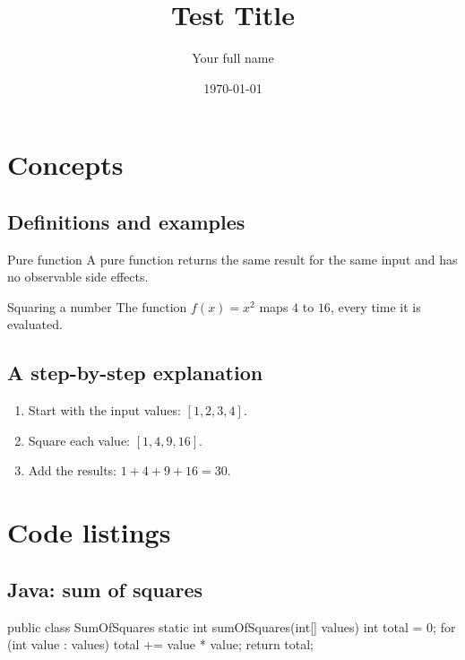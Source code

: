 \documentclass[\BayMode]{baybeamer}
\title{Test Title}
\author[Your name]{Your full name} %
\date{\today}
\begin{document}
\begin{frame}[plain]
  \titlepage
\end{frame}

\section{Concepts}
\subsection{Definitions and examples}
\begin{frame}
  \begin{definitionbox}{Pure function}
    A pure function returns the same result for the same input and has
    no observable side effects.
  \end{definitionbox}
  \begin{examplebox}{Squaring a number}
    The function $f(x)=x^2$ maps $4$ to $16$, every time it is evaluated.
  \end{examplebox}
\end{frame}

\subsection{A step-by-step explanation}
\begin{frame}
  \begin{enumerate}[<+->]
    \item Start with the input values: $[1,2,3,4]$.
    \item Square each value: $[1,4,9,16]$.
    \item Add the results: $1+4+9+16=30$.
  \end{enumerate}
\end{frame}

\section{Code listings}
\subsection{Java: sum of squares}
\begin{frame}[fragile]
\begin{java}
public class SumOfSquares {
    static int sumOfSquares(int[] values) {
        int total = 0;
        for (int value : values) {
            total += value * value;
        }
        return total;
    }
}
\end{java}
\end{frame}
\end{document}
